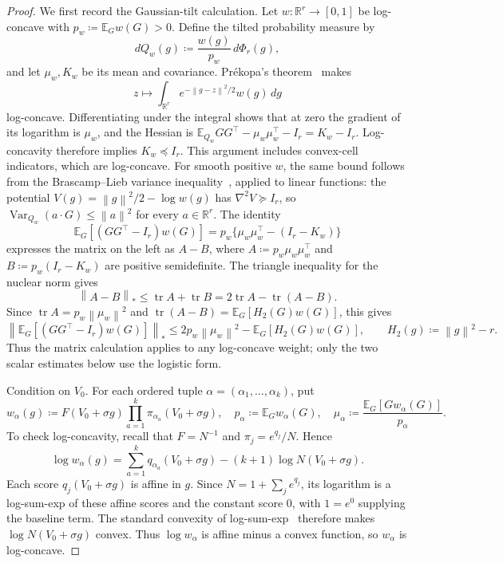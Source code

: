\documentclass[11pt,letterpaper]{article}
\theoremstyle{remark}
\newcommand{\E}{\mathbb E}
\newcommand{\R}{\mathbb R}
\newcommand{\tr}{\operatorname{tr}}
\newcommand{\norm}[1]{\left\lVert#1\right\rVert}
\newcommand{\dd}{\,d}
\begin{document}
\begin{proof}
We first record the Gaussian-tilt calculation. Let \(w:\R^r\to[0,1]\)
be log-concave with \(p_w\coloneqq \E_Gw(G)>0\). Define the tilted
probability measure by
\[
 dQ_w(g)\coloneqq\frac{w(g)}{p_w}\,d\Phi_r(g),
\]
and let \(\mu_w,K_w\) be its mean and covariance. Pr\'ekopa's
theorem~\cite[Theorem~6]{Prekopa1973} makes
\[
 z\longmapsto\int_{\R^r}e^{-\norm{g-z}^2/2}w(g)\dd g
\]
log-concave. Differentiating under the integral shows that at zero
the gradient of its logarithm is \(\mu_w\), and the Hessian is
\(\E_{Q_w}GG^\top-\mu_w\mu_w^\top-I_r=K_w-I_r\).
Log-concavity therefore implies \(K_w\preceq I_r\).
This argument includes convex-cell indicators, which are log-concave.
For smooth positive \(w\), the same bound follows from the
Brascamp--Lieb variance inequality~\cite{BrascampLieb1976}, applied
to linear functions: the potential
\(V(g)=\norm g^2/2-\log w(g)\) has \(\nabla^2V\succeq I_r\),
so \(\operatorname{Var}_{Q_w}(a\cdot G)\le\norm a^2\) for every
\(a\in\R^r\).
The identity
\[
 \E_G[(GG^\top-I_r)w(G)]
 =p_w\{\mu_w\mu_w^\top-(I_r-K_w)\}
\]
expresses the matrix on the left as \(A-B\), where
\(A\coloneqq p_w\mu_w\mu_w^\top\) and \(B\coloneqq p_w(I_r-K_w)\)
are positive semidefinite. The triangle
inequality for the nuclear norm gives
\[
 \norm{A-B}_*\le\tr A+\tr B
 =2\tr A-\tr(A-B).
\]
Since \(\tr A=p_w\norm{\mu_w}^2\) and
\(\tr(A-B)=\E_G[H_2(G)w(G)]\), this gives
\begin{equation}
 \left\|\E_G[(GG^\top-I_r)w(G)]\right\|_*
 \le2p_w\norm{\mu_w}^2-\E_G[H_2(G)w(G)],
 \qquad H_2(g)\coloneqq \norm g^2-r.
 \label{appx-an:matrix-trace-reduction}
\end{equation}
Thus the matrix calculation applies to any log-concave weight; only
the two scalar estimates below use the logistic form.

Condition on \(V_0\). For each ordered tuple
\(\alpha=(\alpha_1,\ldots,\alpha_k)\), put
\[
 w_\alpha(g)\coloneqq F(V_0+\sigma g)
                 \prod_{a=1}^k\pi_{\alpha_a}(V_0+\sigma g),
 \quad p_\alpha\coloneqq \E_Gw_\alpha(G),
 \quad \mu_\alpha\coloneqq \frac{\E_G[Gw_\alpha(G)]}{p_\alpha}.
\]
To check log-concavity, recall that \(F=N^{-1}\) and
\(\pi_j=e^{q_j}/N\). Hence
\[
 \log w_\alpha(g)
 =\sum_{a=1}^k q_{\alpha_a}(V_0+\sigma g)
  -(k+1)\log N(V_0+\sigma g).
\]
Each score \(q_j(V_0+\sigma g)\) is affine in \(g\). Since
\(N=1+\sum_j e^{q_j}\), its logarithm is a log-sum-exp of these
affine scores and the constant score \(0\), with \(1=e^0\) supplying
the baseline term. The standard convexity of
log-sum-exp~\cite[Section~3.1.5, pp.~72--74]{BoydVandenberghe2004}
therefore makes \(\log N(V_0+\sigma g)\) convex. Thus
\(\log w_\alpha\) is affine minus a convex function, so
\(w_\alpha\) is log-concave.


\end{proof}
\end{document}
